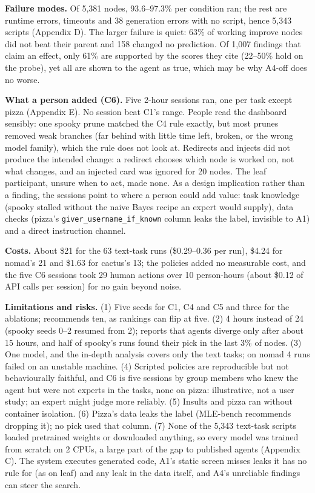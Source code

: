 \documentclass[11pt]{article}
\begin{document}
\textbf{Failure modes.} Of 5,381 nodes, 93.6--97.3\% per condition ran; the rest are
runtime errors, timeouts and 38 generation errors with no script, hence 5,343 scripts
(Appendix D). The larger failure is quiet: 63\% of working improve
nodes did not beat their parent and 158 changed no prediction. Of 1,007 findings that claim an effect,
only 61\% are supported by the scores they cite (22--50\% hold on the probe), yet all
are shown to the agent as true, which may be why A4-off does no worse.

\textbf{What a person added (C6).} Five 2-hour sessions ran, one per task except pizza
(Appendix E). No session beat C1's range. People read the dashboard sensibly: one spooky prune matched the
C4 rule exactly, but most prunes removed weak branches (far behind with little time
left, broken, or the wrong model family), which the rule does not look at. Redirects and
injects did not produce the intended change: a redirect chooses which node is worked on,
not what changes, and an injected card was ignored for 20 nodes. The leaf participant, unsure
when to act, made none. As a design implication rather than a finding, the sessions point to where a person
could add value: task knowledge (spooky stalled without the naive Bayes recipe an expert
would supply), data checks (pizza's \texttt{giver\_username\_if\_known} column leaks
the label, invisible to A1) and a direct instruction channel.

\textbf{Costs.} About \$21 for the 63 text-task runs (\$0.29--0.36 per run), \$4.24
for nomad's 21 and \$1.63 for cactus's 13; the policies added no measurable cost, and the
five C6 sessions took 29 human actions over 10 person-hours (about \$0.12 of API calls
per session) for no gain beyond noise.

\textbf{Limitations and risks.} (1) Five seeds for C1, C4 and C5 and three for the
ablations; \cite{aira} recommends ten, as rankings can flip at five. (2) 4 hours instead of 24 (spooky seeds 0--2 resumed from 2); \cite{aira} reports
that agents diverge only after about 15 hours, and half of spooky's runs found their pick in
the last 3\% of nodes. (3) One
model, and the in-depth analysis covers only the text tasks; on nomad 4 runs failed on an
unstable machine. (4) Scripted policies are reproducible but not behaviourally faithful,
and C6 is five sessions by group members who knew the agent but were not experts in
the tasks, none on pizza: illustrative, not a user study; an expert might judge more
reliably. (5) Insults and pizza ran without container isolation.
(6) Pizza's data leaks the label (MLE-bench
recommends dropping it); no pick used that column. (7) None of the 5,343 text-task scripts loaded pretrained weights or downloaded anything,
so every model was trained from scratch on 2 CPUs, a large part of the gap to published
agents (Appendix C). The system
executes generated code, A1's static screen misses leaks it has no rule for (as on
leaf) and any leak in the data itself, and A4's unreliable findings can steer the search.
\end{document}
